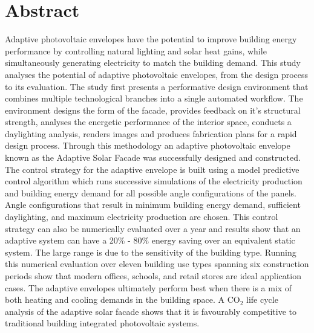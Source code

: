 \begingroup
\let\clearpage\relax
\let\cleardoublepage\relax
\let\cleardoublepage\relax

\chapter*{Abstract}

Adaptive photovoltaic envelopes have the potential to improve building energy performance by controlling natural lighting and solar heat gains, while simultaneously generating electricity to match the building demand. This study analyses the potential of adaptive photovoltaic envelopes, from the design process to its evaluation. The study first presents a performative design environment that combines multiple technological branches into a single automated workflow. The environment designs the form of the facade, provides feedback on it's structural strength, analyses the energetic performance of the interior space, conducts a daylighting analysis, renders images and produces fabrication plans for a rapid design process. Through this methodology an adaptive photovoltaic envelope known as the Adaptive Solar Facade was successfully designed and constructed. The control strategy for the adaptive envelope is built using a model predictive control algorithm which runs successive simulations of the electricity production and building energy demand for all possible angle configurations of the panels. Angle configurations that result in minimum building energy demand, sufficient daylighting, and maximum electricity production are chosen. This control strategy can also be numerically evaluated over a year and results show that an adaptive system can have a 20\% - 80\% energy saving over an equivalent static system. The large range is due to the sensitivity of the building type. Running this numerical evaluation over eleven building use types spanning six construction periods show that modern offices, schools, and retail stores are ideal application cases. The adaptive envelopes ultimately perform best when there is a mix of both heating and cooling demands in the building space. A CO$_2$ life cycle analysis of the adaptive solar facade shows that it is favourably competitive to traditional building integrated photovoltaic systems.

\endgroup

\cleardoublepage%

